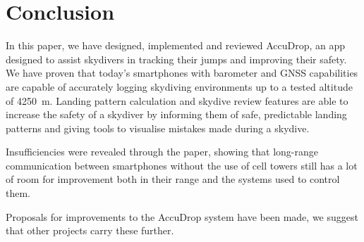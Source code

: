 \section{Conclusion}\label{sec:conclusion}

In this paper, we have designed, implemented and reviewed AccuDrop, an app designed to assist skydivers in tracking their jumps and improving their safety. We have proven that today's smartphones with barometer and GNSS capabilities are capable of accurately logging skydiving environments up to a tested altitude of \SI{4250}{\metre}. Landing pattern calculation and skydive review features are able to increase the safety of a skydiver by informing them of safe, predictable landing patterns and giving tools to visualise mistakes made during a skydive.

Insufficiencies were revealed through the paper, showing that long-range communication between smartphones without the use of cell towers still has a lot of room for improvement both in their range and the systems used to control them.

Proposals for improvements to the AccuDrop system have been made, we suggest that other projects carry these further.
